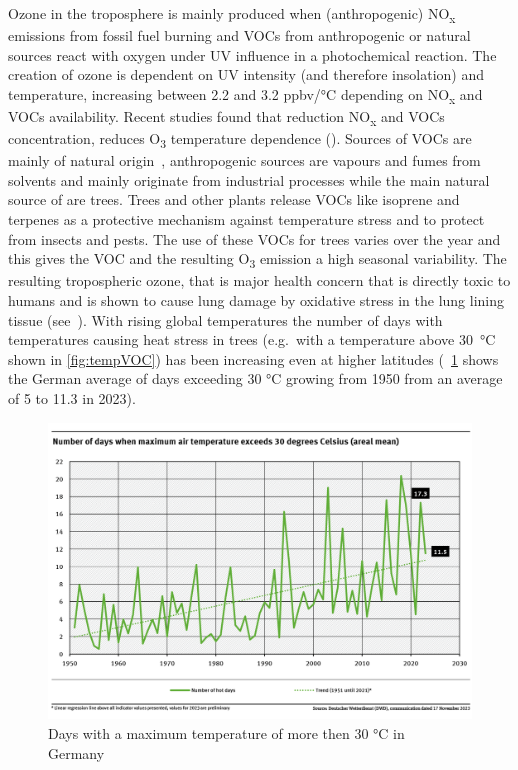 \documentclass[12pt,a4paper, english,twoside]{article}
\begin{document}
      Ozone in the troposphere is mainly produced when (anthropogenic) NO\textsubscript{x} emissions from fossil fuel burning and \glspl{VOC} from anthropogenic or natural sources react with oxygen under UV influence in a photochemical reaction.
      The creation of ozone is dependent on UV intensity (and therefore insolation) and temperature, increasing between 2.2 and 3.2 ppbv/°C depending on NO\textsubscript{x} and \glspl{VOC} availability. 
      Recent studies found that reduction NO\textsubscript{x} and \glspl{VOC} concentration, reduces O\textsubscript{3} temperature dependence (\cite{Otero2021}).
      Sources of \glspl{VOC} are mainly of natural origin~\autocite{Kansal2009}, anthropogenic sources are vapours and fumes from solvents and mainly originate from industrial processes while the main natural source of  are trees.
      Trees and other plants release VOCs like isoprene and terpenes as a protective mechanism against temperature stress and to protect from insects and pests. 
      The use of these \glspl{VOC} for trees varies over the year and this gives the \gls{VOC} and the resulting O\textsubscript{3} emission a high seasonal variability. 
%
      The resulting tropospheric ozone, that is major health concern that is directly toxic to humans and is shown to cause lung damage by oxidative stress in the lung lining tissue (see~\cite{Mudway2000}). 
      With rising global temperatures the number of days with temperatures causing heat stress in trees (e.g.\ with a temperature above 30~°C shown in \cref{fig:tempVOC}) has been increasing even at higher latitudes (~\cref{fig:ubaTemps} shows the German average of days exceeding 30 °C growing from 1950 from an average of 5 to 11.3 in 2023).
      \begin{figure}[htbp]
       \begin{center}
         \includegraphics[width=\textwidth]{img/ubaTemp.png}
       \end{center}
       \caption{Days with a maximum temperature of more then 30 °C in Germany~\autocite[Reprinted from]{Wilke2023}\label{fig:ubaTemps}}
      \end{figure}
\end{document}
